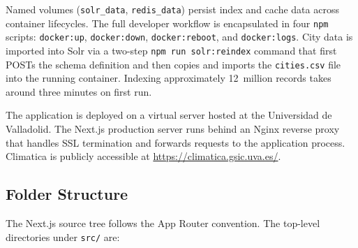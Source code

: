 Named volumes (\texttt{solr\_data}, \texttt{redis\_data}) persist index and
cache data across container lifecycles. The full developer workflow is
encapsulated in four \texttt{npm} scripts: \texttt{docker:up},
\texttt{docker:down}, \texttt{docker:reboot}, and \texttt{docker:logs}.
City data is imported into Solr via a two-step \texttt{npm run solr:reindex}
command that first POSTs the schema definition and then copies and imports the
\texttt{cities.csv} file into the running container. Indexing approximately
12~million records takes around three minutes on first run.

The application is deployed on a virtual server hosted at the Universidad de
Valladolid. The Next.js production server runs behind an Nginx reverse proxy
that handles SSL termination and forwards requests to the application process.
Climatica is publicly accessible at \url{https://climatica.gsic.uva.es/}.

\subsection{Folder Structure}\label{APP_ARCH_FOLDERS}

The Next.js source tree follows the App Router convention. The top-level
directories under \texttt{src/} are:

